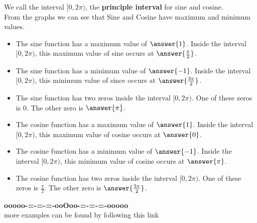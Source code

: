 \documentclass{ximera}
\begin{document}
We call the interval $[0, 2\pi)$, the \textbf{principle interval} for sine and cosine. \\

From the graphs we can see that Sine and Cosine have maximum and minimum values.



\begin{explanation}
\begin{itemize}

  \item The sine function has a maximum value of $\answer{1}$.  Inside the interval $[0, 2\pi)$, this maximum value of sine occurs at $\answer{\frac{\pi}{2}}$.

  \item The sine function has a minimum value of $\answer{-1}$.  Inside the interval $[0, 2\pi)$, this minimum value of since occurs at $\answer{\frac{3\pi}{2}}$.

  \item The sine function has two zeros inside the interval $[0, 2\pi)$. One of these zeros is $0$.  The other zero is $\answer{\pi}$.


\end{itemize}





\begin{itemize}
  
  \item The cosine function has a maximum value of $\answer{1}$.  Inside the interval $[0, 2\pi)$, this maximum value of cosine occurs at $\answer{0}$.

  \item The cosine function has a minimum value of $\answer{-1}$.  Inside the interval $[0, 2\pi)$, this minimum value of cosine occurs at $\answer{\pi}$.

  \item The cosine function has two zeros inside the interval $[0, 2\pi)$. One of these zeros is $\frac{\pi}{2}$.  The other zero is $\answer{\frac{3\pi}{2}}$.


\end{itemize}

\end{explanation}














\begin{center}
\textbf{\textcolor{green!50!black}{ooooo-=-=-=-ooOoo-=-=-=-ooooo}} \\

more examples can be found by following this link\\ 

\end{center}
\end{document}
